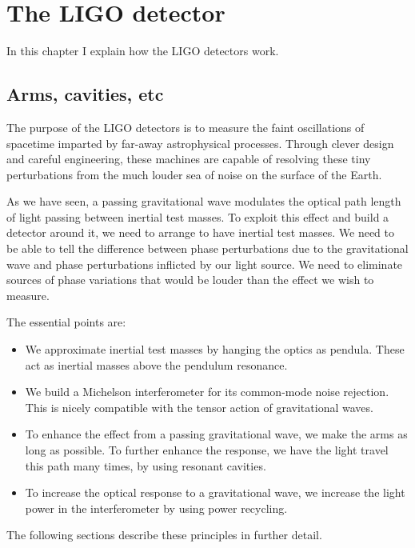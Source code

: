 \chapter{The LIGO detector}
\label{chapter2}

In this chapter I explain how the LIGO detectors work.

\section{Arms, cavities, etc}

The purpose of the LIGO detectors is to measure the faint
oscillations of spacetime imparted by far-away astrophysical
processes.  Through clever design and careful engineering, these
machines are capable of resolving these tiny perturbations from the
much louder sea of noise on the surface of the Earth.

As we have seen, a passing gravitational wave modulates the optical
path length of light passing between inertial test
masses.  To exploit this effect and build a detector around it, we
need to arrange to have inertial test masses.  We need to be able to
tell the difference between phase perturbations due to the
gravitational wave and phase perturbations inflicted by our light
source.  We need to eliminate sources of phase variations that would
be louder than the effect we wish to measure.  

The essential points are:
\begin{itemize}
\item We approximate inertial test masses by hanging the optics as
  pendula.  These act as inertial masses above the pendulum resonance.
\item We build a Michelson interferometer for its common-mode noise
  rejection.  This is nicely compatible with the tensor action of
  gravitational waves.
\item To enhance the effect from a passing gravitational wave, we make
  the arms as long as possible.  To further enhance the response, we
  have the light travel this path many times, by using resonant cavities.
\item To increase the optical response to a gravitational wave, we
  increase the light power in the interferometer by using power
  recycling.
\end{itemize}
The following sections describe these principles in further detail.
